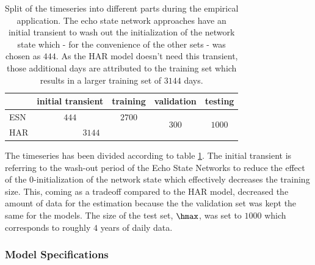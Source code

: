 \begin{table}
\begin{center}
    \begin{tabular}{l|c|c|c|c}
        & initial transient & training & validation & testing \\ \hline
        ESN & $444$ & $2700$ & \multirow{2}{*}{$300$} & \multirow{2}{*}{$1000$} \\
        \cline{1-3}
        HAR & \multicolumn{2}{|c|}{$3144$} & & 
    \end{tabular}
    \label{TABLE:TimeSeriesSplit}
\end{center}
\caption{Split of the timeseries into different parts during the empirical application. The echo state network approaches have an initial transient to wash out the initialization of the network state which - for the convenience of the other sets - was chosen as $444$. As the HAR model doesn't need this transient, those additional days are attributed to the training set which results in a larger training set of $3144$ days.}
\end{table}

The timeseries has been divided according to table \ref{TABLE:TimeSeriesSplit}. The initial transient is referring to the wash-out period of the Echo State Networks to reduce the effect of the 0-initialization of the network state which effectively decreases the training size. This, coming as a tradeoff compared to the HAR model, decreased the amount of data for the estimation because the the validation set was kept the same for the models. The size of the test set, $\hmax$, was set to $1000$ which corresponds to roughly $4$ years of daily data.



\subsubsection{Model Specifications}


